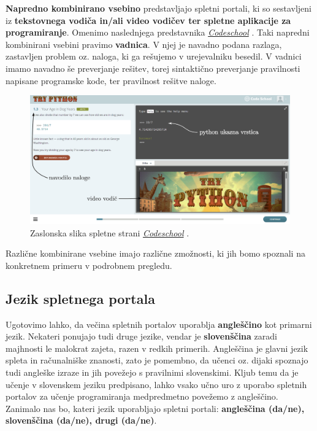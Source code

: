 \textbf{Napredno kombinirano vsebino} predstavljajo spletni portali,
ki so sestavljeni iz \textbf{tekstovnega vodiča in/ali video vodičev ter
  spletne aplikacije za programiranje}. Omenimo naslednjega
predstavnika \emph{\href{https://www.codeschool.com/}{Codeschool}}
\cite{web:codeschool}. Taki napredni kombinirani vsebini pravimo \textbf{vadnica}. V njej je navadno podana razlaga, zastavljen
problem oz. naloga, ki ga rešujemo v urejevalniku besedil. V vadnici
imamo navadno še  preverjanje rešitev, torej sintaktično preverjanje
pravilnosti napisane programske kode, ter pravilnost rešitve naloge.

\begin{figure}[h!]
    \includegraphics [width=1\linewidth, keepaspectratio =
    1] {./images/sc_web/codeschool_01.jpg}
    \caption{Zaslonska slika spletne strani
      \emph{\href{https://www.codeschool.com/}{Codeschool}}
      \cite{web:codeschool}.}
    \label{fig:scr:web:codeschool}
\end{figure}

Različne kombinirane vsebine imajo različne zmožnosti, ki jih bomo
spoznali na konkretnem primeru v podrobnem pregledu.

\subsection{Jezik spletnega portala}
\label{sec:jezik_spletnega_portala}

Ugotovimo lahko, da večina spletnih portalov uporablja
\textbf{angleščino} kot primarni jezik. Nekateri ponujajo tudi druge
jezike, vendar je \textbf{slovenščina} zaradi majhnosti le malokrat
zajeta, razen v redkih primerih. Angleščina je glavni jezik spleta in
računalniške znanosti, zato je pomembno, da učenci oz. dijaki spoznajo
tudi angleške izraze in jih povežejo s pravilnimi
slovenskimi. Kljub temu da je učenje v slovenskem jeziku predpisano,
lahko vsako učno uro z uporabo spletnih portalov za učenje
programiranja medpredmetno povežemo z angleščino. Zanimalo nas bo,
kateri jezik uporabljajo spletni portali: \textbf{angleščina (da/ne),
  slovenščina (da/ne), drugi (da/ne)}.

